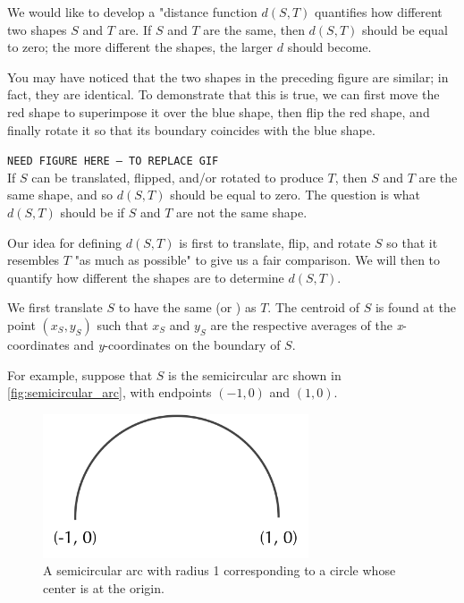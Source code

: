 {{We would like to develop a "distance function $d(S, T)$ quantifies how different two shapes $S$ and $T$ are. If $S$ and $T$ are the same, then $d(S, T)$ should be equal to zero; the more different the shapes, the larger $d$ should become.

You may have noticed that the two shapes in the preceding figure are similar; in fact, they are identical. To demonstrate that this is true, we can first move the red shape to superimpose it over the blue shape, then flip the red shape, and finally rotate it so that its boundary coincides with the blue shape.

\texttt{NEED FIGURE HERE -- TO REPLACE GIF}\\

If $S$ can be translated, flipped, and/or rotated to produce $T$, then $S$ and $T$ are the same shape, and so $d(S, T)$ should be equal to zero. The question is what $d(S, T)$ should be if $S$ and $T$ are not the same shape.

Our idea for defining $d(S, T)$ is first to translate, flip, and rotate $S$ so that it resembles $T$ "as much as possible" to give us a fair comparison. We will then to quantify how different the shapes are to determine $d(S, T)$.

We first translate $S$ to have the same  (or ) as $T$. The centroid of $S$ is found at the point $(x_{S}, y_{S})$ such that $x_{S}$ and $y_{S}$ are the respective averages of the \textit{x}-coordinates and \textit{y}-coordinates on the boundary of $S$.

For example, suppose that $S$ is the semicircular arc shown in \autoref{fig:semicircular_arc}, with endpoints $(-1, 0)$ and $(1, 0)$.

\begin{figure}[h]
	\centering
	\mySfFamily
	\includegraphics[width = 0.7\textwidth]{../images/semicircular_arc.png}
	\caption{A semicircular arc with radius 1 corresponding to a circle whose center is at the origin.}
	\label{fig:semicircular_arc}
\end{figure}

}}
